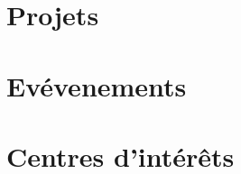 \begin{sloppypar}
\begin{paracol}{2}
\begin{absolutelynopagebreak}

\section{Projets}




\section{Ev\'evenements}




\section{Centres d'int\'er\^ets}


\end{absolutelynopagebreak}

\end{paracol}
\end{sloppypar}

